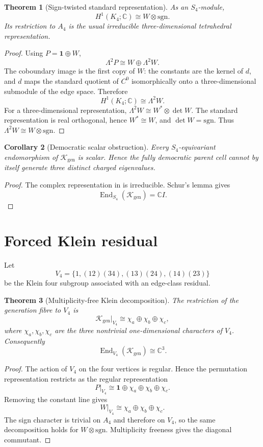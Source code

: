 \documentclass[11pt,oneside,openany]{book}
\numberwithin{equation}{chapter}
\newtheorem{theorem}{Theorem}[chapter]
\newtheorem{corollary}[theorem]{Corollary}
\theoremstyle{definition}
\theoremstyle{remark}
\newcommand{\C}{\mathbb C}
\newcommand{\End}{\operatorname{End}}
\newcommand{\Kgen}{\mathcal K_{\mathrm{gen}}}
\newcommand{\sgnrep}{\mathrm{sgn}}
\begin{document}
\begin{theorem}[Sign-twisted standard representation]
\label{thm:k4-representation}
As an $S_4$-module,
\[
 \boxed{H^1(K_4;\C)\cong W\otimes\sgnrep.}
\]
Its restriction to $A_4$ is the usual irreducible three-dimensional tetrahedral representation.
\end{theorem}

\begin{proof}
Using $P=\mathbf1\oplus W$,
\[
 \Lambda^2P\cong W\oplus\Lambda^2W.
\]
The coboundary image is the first copy of $W$: the constants are the kernel of $d$, and $d$ maps the standard quotient of $C^0$ isomorphically onto a three-dimensional submodule of the edge space.  Therefore
\[
 H^1(K_4;\C)\cong\Lambda^2W.
\]
For a three-dimensional representation, $\Lambda^2W\cong W^*\otimes\det W$.  The standard representation is real orthogonal, hence $W^*\cong W$, and $\det W=\sgnrep$.  Thus $\Lambda^2W\cong W\otimes\sgnrep$.
\end{proof}

\begin{corollary}[Democratic scalar obstruction]
\label{cor:democratic-scalar}
Every $S_4$-equivariant endomorphism of $\Kgen$ is scalar.  Hence the fully democratic parent cell cannot by itself generate three distinct charged eigenvalues.
\end{corollary}

\begin{proof}
The complex representation in  is irreducible.  Schur's lemma gives
\[
 \End_{S_4}(\Kgen)=\C I.
\]
\end{proof}

\section{Forced Klein residual}
Let
\[
 V_4=\{1,(12)(34),(13)(24),(14)(23)\}
\]
be the Klein four subgroup associated with an edge-class residual.

\begin{theorem}[Multiplicity-free Klein decomposition]
\label{thm:v4-decomp}
The restriction of the generation fibre to $V_4$ is
\[
 \boxed{
 \Kgen|_{V_4}\cong\chi_a\oplus\chi_b\oplus\chi_c,
 }
\]
where $\chi_a,\chi_b,\chi_c$ are the three nontrivial one-dimensional characters of $V_4$.  Consequently
\[
 \boxed{
 \End_{V_4}(\Kgen)\cong\C^3.
 }
\]
\end{theorem}

\begin{proof}
The action of $V_4$ on the four vertices is regular.  Hence the permutation representation restricts as the regular representation
\[
 P|_{V_4}\cong\mathbf1\oplus\chi_a\oplus\chi_b\oplus\chi_c.
\]
Removing the constant line gives
\[
 W|_{V_4}\cong\chi_a\oplus\chi_b\oplus\chi_c.
\]
The sign character is trivial on $A_4$ and therefore on $V_4$, so the same decomposition holds for $W\otimes\sgnrep$.  Multiplicity freeness gives the diagonal commutant.
\end{proof}
\end{document}
